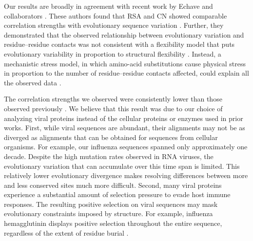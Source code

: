 \documentclass[smallextended]{svjour3}
\begin{document}
Our results are broadly in agreement with recent work by Echave and collaborators \citep{Yehetal2014,Huangetal2014}. These authors found that RSA and CN showed comparable correlation strengths with evolutionary sequence variation \citep{Yehetal2014}. Further, they demonstrated that the observed relationship between evolutionary variation and residue--residue contacts was not consistent with a flexibility model that puts evolutionary variability in proportion to structural flexibility \citep{Huangetal2014}. Instead, a mechanistic stress model, in which amino-acid substitutions cause physical stress in proportion to the number of residue--residue contacts affected, could explain all the observed data \citep{Huangetal2014}.

The correlation strengths we observed were consistently lower than those observed previously \citep{Jacksonetal2013,Yehetal2014}. We believe that this result was due to our choice of analyzing viral proteins instead of the cellular proteins or enzymes used in prior works. First, while viral sequences are abundant, their alignments may not be as diverged as alignments that can be obtained for sequences from cellular organisms. For example, our influenza sequences spanned only approximately one decade. Despite the high mutation rates observed in RNA viruses, the evolutionary variation that can accumulate over this time span is limited. This relatively lower evolutionary divergence makes resolving differences between more and less conserved sites much more difficult. Second, many viral proteins experience a substantial amount of selection pressure to evade host immune responses. The resulting positive selection on viral sequences may mask evolutionary constraints imposed by structure. For example, influenza hemagglutinin displays positive selection throughout the entire sequence, regardless of the extent of residue burial \citep{MeyerWilke2013,Meyeretal2013,Suzuki2006,Bushetal1999}.
\end{document}

